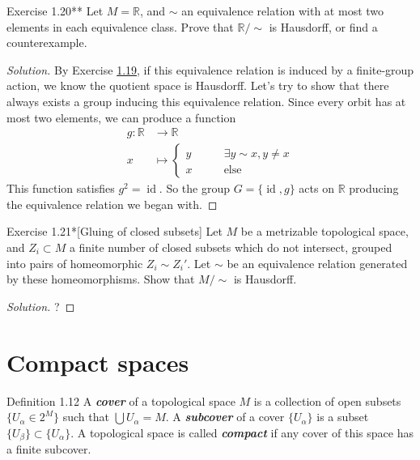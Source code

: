 \begin{thing4}{Exercise 1.20**}\label{exer:1.20}\leavevmode
Let $M=\mathbb{R}$, and $\sim$ an equivalence relation with at most two elements in each equivalence class. Prove that $\mathbb{R}/\sim$ is Hausdorff, or find a counterexample.
\end{thing4}

\begin{proof}[Solution]\leavevmode
By Exercise \hyperref[exer:1.19]{1.19}, if this equivalence relation is induced by a finite-group action, we know the quotient space is Hausdorff. Let's try to show that there always exists a group inducing this equivalence relation. Since every orbit has at most two elements, we can produce a function
\begin{align*}
	g: \mathbb{R} &\longrightarrow \mathbb{R} \\
	x &\longmapsto \begin{cases}
		y\qquad &\exists y\sim x,y \neq x \\
		x\qquad & \text{else} 
	\end{cases} 
\end{align*}
This function satisfies $g^2=\operatorname{id}$. So the group $G=\{\operatorname{id},g\}$ acts on $\mathbb{R}$ producing the equivalence relation we began with.
\end{proof}

\begin{thing4}{Exercise 1.21*}[Gluing of closed subsets]\label{exer:1.21}\leavevmode
Let $M$ be a metrizable topological space, and $Z_i \subset M$ a finite number of closed subsets which do not intersect, grouped into pairs of homeomorphic $Z_i \sim Z_i'$. Let $\sim$ be an equivalence relation generated by these homeomorphisms. Show that $M/\sim$ is Hausdorff.
\end{thing4}

\begin{proof}[Solution]\leavevmode
{\color{2}?}
\end{proof}

\section{Compact spaces}

\begin{thing3}{Definition 1.12}\leavevmode
	A \textit{\textbf{cover}} of a topological space $M$ is a collection of open subsets $\{U_\alpha \in 2^M\}$ such that $\bigcup U_\alpha=M $. A \textit{\textbf{subcover}} of a cover $\{U_\alpha\}$ is a subset $\{U_\beta\}\subset \{U_\alpha\}$. A topological space is called \textit{\textbf{compact}} if any cover of this space has a finite subcover.
\end{thing3}

